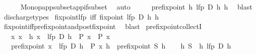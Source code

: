 \begin{isabellebody}
\ \ \ \ \isamarkupfalse%
\ Monop{\isacharunderscore}{\kern0pt}app{\isacharunderscore}{\kern0pt}subset{\isacharunderscore}{\kern0pt}app{\isacharunderscore}{\kern0pt}if{\isacharunderscore}{\kern0pt}subset\ \isamarkupfalse%
\ auto\isanewline
\ \ \isamarkupfalse%
\ \isamarkupfalse%
\ {\isachardoublequoteopen}prefixpoint\ {\isacharparenleft}{\kern0pt}h\ {\isacharparenleft}{\kern0pt}lfp\ D\ h{\isacharparenright}{\kern0pt}{\isacharparenright}{\kern0pt}\ h{\isachardoublequoteclose}\ \isamarkupfalse%
\ blast\isanewline
{}\isamarkupfalse%
\ discharge{\isacharunderscore}{\kern0pt}types%
\endisatagproof
{\isafoldproof}%
%
\isadelimproof
\isanewline
%
\endisadelimproof
\isanewline
{}\isamarkupfalse%
\ fixpoint{\isacharunderscore}{\kern0pt}lfp\ {\isacharbrackleft}{\kern0pt}iff{\isacharbrackright}{\kern0pt}{\isacharcolon}{\kern0pt}\ {\isachardoublequoteopen}fixpoint\ {\isacharparenleft}{\kern0pt}lfp\ D\ h{\isacharparenright}{\kern0pt}\ h{\isachardoublequoteclose}\isanewline
%
\isadelimproof
\ \ %
\endisadelimproof
%
\isatagproof
{}\isamarkupfalse%
\ fixpoint{\isacharunderscore}{\kern0pt}iff{\isacharunderscore}{\kern0pt}prefixpoint{\isacharunderscore}{\kern0pt}and{\isacharunderscore}{\kern0pt}postfixpoint\ \isamarkupfalse%
\ blast%
\endisatagproof
{\isafoldproof}%
%
\isadelimproof
%
\endisadelimproof
%
\isadelimdocument
%
\endisadelimdocument
%
\isatagdocument
%
\isamarkuptrue%
%
\endisatagdocument
{\isafolddocument}%
%
\isadelimdocument
%
\endisadelimdocument
{}\isamarkupfalse%
\ prefixpoint{\isacharunderscore}{\kern0pt}collectI{\isacharcolon}{\kern0pt}\isanewline
\ \ \ {\isachardoublequoteopen}{\isasymAnd}x{\isachardot}{\kern0pt}\ x\ {\isasymin}\ h\ {\isacharbraceleft}{\kern0pt}x\ {\isasymin}\ lfp\ D\ h\ {\isacharbar}{\kern0pt}\ P\ x{\isacharbraceright}{\kern0pt}\ {\isasymLongrightarrow}\ P\ x{\isachardoublequoteclose}\isanewline
\ \ \ {\isachardoublequoteopen}prefixpoint\ {\isacharbraceleft}{\kern0pt}x\ {\isasymin}\ lfp\ D\ h\ {\isacharbar}{\kern0pt}\ P\ x{\isacharbraceright}{\kern0pt}\ h{\isachardoublequoteclose}\ {\isacharparenleft}{\kern0pt}\ {\isachardoublequoteopen}prefixpoint\ {\isacharquery}{\kern0pt}S\ h{\isachardoublequoteclose}{\isacharparenright}{\kern0pt}\isanewline
%
\isadelimproof
%
\endisadelimproof
%
\isatagproof
{}\isamarkupfalse%
\isanewline
\ \ \isamarkupfalse%
\ {\isachardoublequoteopen}h\ {\isacharquery}{\kern0pt}S\ {\isasymsubseteq}\ h\ {\isacharparenleft}{\kern0pt}lfp\ D\ h{\isacharparenright}{\kern0pt}{\isachardoublequoteclose}\isanewline

\end{isabellebody}
